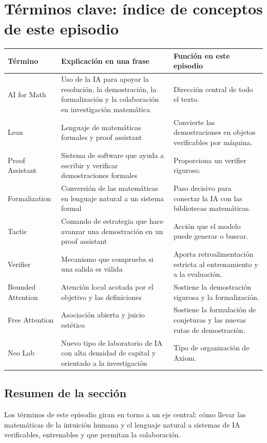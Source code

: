 \section{Términos clave: índice de conceptos de este episodio}

\begin{longtable}{p{}p{}p{}}
\toprule
Término & Explicación en una frase & Función en este episodio \\
\midrule
AI for Math & Uso de la IA para apoyar la resolución, la demostración, la formalización y la colaboración en investigación matemática & Dirección central de todo el texto. \\
Lean & Lenguaje de matemáticas formales y proof assistant & Convierte las demostraciones en objetos verificables por máquina. \\
Proof Assistant & Sistema de software que ayuda a escribir y verificar demostraciones formales & Proporciona un verifier riguroso. \\
Formalization & Conversión de las matemáticas en lenguaje natural a un sistema formal & Paso decisivo para conectar la IA con las bibliotecas matemáticas. \\
Tactic & Comando de estrategia que hace avanzar una demostración en un proof assistant & Acción que el modelo puede generar o buscar. \\
Verifier & Mecanismo que comprueba si una salida es válida & Aporta retroalimentación estricta al entrenamiento y a la evaluación. \\
Bounded Attention & Atención local acotada por el objetivo y las definiciones & Sostiene la demostración rigurosa y la formalización. \\
Free Attention & Asociación abierta y juicio estético & Sostiene la formulación de conjeturas y las nuevas rutas de demostración. \\
Neo Lab & Nuevo tipo de laboratorio de IA con alta densidad de capital y orientado a la investigación & Tipo de organización de Axiom. \\
\bottomrule
\end{longtable}

\subsection{Resumen de la sección}

Los términos de este episodio giran en torno a un eje central: cómo llevar las matemáticas de la intuición humana y el lenguaje natural a sistemas de IA verificables, entrenables y que permitan la colaboración.

